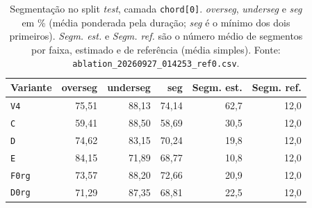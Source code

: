 \begin{table}[t]
  \centering
  \caption{Segmentação no split \emph{test}, camada \texttt{chord[0]}. \emph{overseg}, \emph{underseg} e \emph{seg} em \% (média ponderada pela duração; \emph{seg} é o mínimo dos dois primeiros). \emph{Segm. est.} e \emph{Segm. ref.} são o número médio de segmentos por faixa, estimado e de referência (média simples). Fonte: \texttt{ablation\_20260927\_014253\_ref0.csv}.}
  \label{tab:segmentacao}
  \footnotesize
  \begin{tabular}{lrrrrr}
    \toprule
    Variante & overseg & underseg & seg & Segm. est. & Segm. ref. \\
    \midrule
    \texttt{V4} & 75,51 & 88,13 & 74,14 & 62,7 & 12,0 \\
    \texttt{C} & 59,41 & 88,50 & 58,69 & 30,5 & 12,0 \\
    \texttt{D} & 74,62 & 83,15 & 70,24 & 19,8 & 12,0 \\
    \texttt{E} & 84,15 & 71,89 & 68,77 & 10,8 & 12,0 \\
    \texttt{F0rg} & 73,57 & 88,20 & 72,66 & 20,9 & 12,0 \\
    \texttt{D0rg} & 71,29 & 87,35 & 68,81 & 22,5 & 12,0 \\
    \bottomrule
  \end{tabular}
\end{table}
